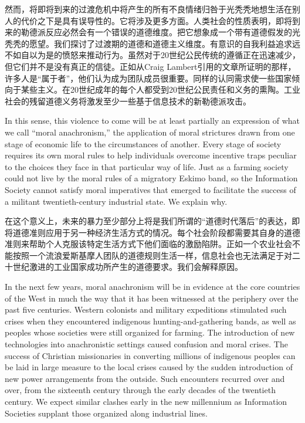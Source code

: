 \begin{Parallel}{97mm}{45mm}
  \ParallelRText
  {\small 然而，将即将到来的过渡危机中将产生的所有不良情绪归咎于光秃秃地想生活在别人的代价之下是具有误导性的。它将涉及更多方面。人类社会的性质表明，即将到来的勒德派反应必然会有一个错误的道德维度。把它想象成一个带有道德假发的光秃秃的愿望。我们探讨了过渡期的道德和道德主义维度。有意识的自我利益追求远不如自以为是的愤怒来推动行为。虽然对于20世纪公民传统的遵循正在迅速减少，但它们并不是没有真正的信徒。正如从Craig Lambert引用的文章所证明的那样，许多人是“属于者”，他们认为成为团队成员很重要。同样的认同需求使一些国家倾向于某些主义。在20世纪成年的每个人都受到20世纪公民责任和义务的熏陶。工业社会的残留道德义务将激发至少一些基于信息技术的新勒德派攻击。 }

\ParallelPar  

  \ParallelLText
  {In this sense, this violence to come will be at least partially an expression of what we call “moral anachronism,” the application of moral strictures drawn from one stage of economic life to the circumstances of another. Every stage of society requires its own moral rules to help individuals overcome incentive traps peculiar to the choices they face in that particular way of life. Just as a farming society could not live by the moral rules of a migratory Eskimo band, so the Information Society cannot satisfy moral imperatives that emerged to facilitate the success of a militant twentieth-century industrial state. We explain why. }
  
  \ParallelRText
  {\small 在这个意义上，未来的暴力至少部分上将是我们所谓的“道德时代落后”的表达，即将道德准则应用于另一种经济生活方式的情况。每个社会阶段都需要其自身的道德准则来帮助个人克服该特定生活方式下他们面临的激励陷阱。正如一个农业社会不能按照一个流浪爱斯基摩人团队的道德规则生活一样，信息社会也无法满足于对二十世纪激进的工业国家成功所产生的道德要求。我们会解释原因。 }

\ParallelPar 
 
  \ParallelLText
  {In the next few years, moral anachronism will be in evidence at the core countries of the West in much the way that it has been witnessed at the periphery over the past five centuries. Western colonists and military expeditions stimulated such crises when they encountered indigenous hunting-and-gathering bands, as well as peoples whose societies were still organized for farming. The introduction of new technologies into anachronistic settings caused confusion and moral crises. The success of Christian missionaries in converting millions of indigenous peoples can be laid in large measure to the local crises caused by the sudden introduction of new power arrangements from the outside. Such encounters recurred over and over, from the sixteenth century through the early decades of the twentieth century. We expect similar clashes early in the new millennium as Information Societies supplant those organized along industrial lines. }
  

\end{Parallel}
